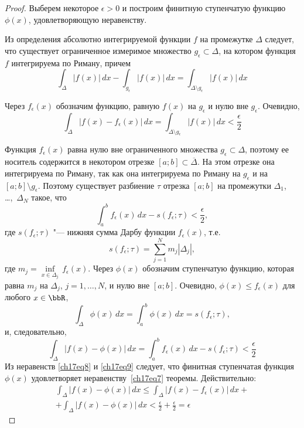 \begin{proof}
Выберем некоторое $\epsilon > 0$ и построим финитную ступенчатую функцию $\phi(x)$, удовлетворяющую неравенству.

Из определения абсолютно интегрируемой функции $f$ на промежутке $\Delta$ следует, что существует ограниченное измеримое множество $g_{\epsilon} \subset \Delta$, на котором функция $f$ интегрируема по Риману, причем
$$
\int_{\Delta} |f(x)|\,dx - \int_{g_{\epsilon}} |f(x)|\,dx = \int_{\Delta\setminus g_{\epsilon}} |f(x)|\,dx
$$

Через $f_{\epsilon}(x)$ обозначим функцию, равную $f(x)$ на $g_{\epsilon}$ и нулю вне $g_{\epsilon}$. Очевидно,
\begin{equation} \label{ch17eq8}
\int_{\Delta} |f(x) - f_{\epsilon}(x)|\,dx = \int_{\Delta\setminus g_{\epsilon}} |f(x)|\,dx < \frac{\epsilon}{2}
\end{equation}

Функция $f_{\epsilon}(x)$ равна нулю вне ограниченного множества $g_{\epsilon} \subset \Delta$, поэтому ее носитель содержится в некотором отрезке $[a;b] \subset \overline{\Delta}$. На этом отрезке она интегрируема по Риману, так как она интегрируема по Риману на $g_{\epsilon}$ и на $[a;b]\setminus g_{\epsilon}$. Поэтому существует разбиение $\tau$ отрезка $[a;b]$ на промежутки $\Delta_1$, \ldots,~$\Delta_N$ такое, что
$$
\int_{a}^{b} f_{\epsilon}(x)\,dx - s(f_{\epsilon};\tau) < \frac{\epsilon}{2},
$$
где $s(f_{\epsilon};\tau)$ "--- нижняя сумма Дарбу функции $f_{\epsilon}(x)$, т.е.
$$
s(f_{\epsilon};\tau) = \sum_{j = 1}^{N} m_{j}|\Delta_j|,
$$
где $m_j = \inf\limits_{x \in \Delta_j}\,f_{\epsilon}(x)$. Через $\phi(x)$ обозначим ступенчатую функцию, которая равна $m_j$ на $\Delta_j$, $j = 1,\ldots,N$, и нулю вне $[a;b]$. Очевидно, $\phi(x) \le f_{\epsilon}(x)$ для любого $x \in \bbR$,
$$
\int_{\Delta} \phi(x)\,dx = \int_{a}^{b} \phi(x)\,dx = s(f_{\epsilon};\tau),
$$
и, следовательно,
\begin{equation} \label{ch17eq9}
\int_{\Delta} |f(x) - \phi(x)|\,dx = \int_{a}^{b} f_{\epsilon}(x)\,dx - s(f_{\epsilon};\tau) < \frac{\epsilon}{2}
\end{equation}
Из неравенств \eqref{ch17eq8} и \eqref{ch17eq9} следует, что финитная ступенчатая функция~$\phi(x)$ удовлетворяет неравенству~\eqref{ch17eq7} теоремы. Действительно:
\begin{multline*}
\int_{\Delta} |f(x) - \phi(x)|\,dx \le \int_{\Delta} |f(x) - f_{\epsilon}(x)|\,dx+\\
+\int_{\Delta} |f(x) - \phi(x)|\,dx < \frac{\epsilon}{2} + \frac{\epsilon}{2} = \epsilon \tag*{\qedhere}
\end{multline*}
\end{proof}

